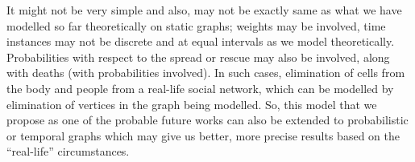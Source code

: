 It might not be very simple and also, may not be exactly same as what we have modelled so far theoretically on static graphs; weights may be involved, time instances may not be discrete and at equal intervals as we model theoretically. Probabilities with respect to the spread or rescue may also be involved, along with deaths (with probabilities involved). In such cases, elimination of cells from the body and people from a real-life social network, which can be modelled by elimination of vertices in the graph being modelled. So, this model that we propose as one of the probable future works can also be extended to probabilistic or temporal graphs which may give us better, more precise results based on the ``real-life'' circumstances.